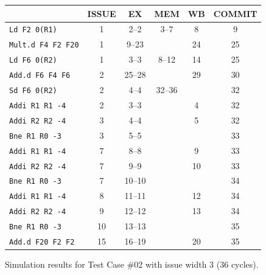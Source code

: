 \documentclass[11pt]{article}
\renewcommand{\_}{\origunderscore\allowbreak}
\begin{document}
\begin{figure}[H]
\centering
\small
\begin{tabular}{lccccc}
\hline
 & ISSUE & EX & MEM & WB & COMMIT \\
\hline
\texttt{Ld F2 0(R1)} & 1 & 2--2 & 3--7 & 8 & 9 \\
\texttt{Mult.d F4 F2 F20} & 1 & 9--23 &  & 24 & 25 \\
\texttt{Ld F6 0(R2)} & 1 & 3--3 & 8--12 & 14 & 25 \\
\texttt{Add.d F6 F4 F6} & 2 & 25--28 &  & 29 & 30 \\
\texttt{Sd F6 0(R2)} & 2 & 4--4 & 32--36 &  & 32 \\
\texttt{Addi R1 R1 -4} & 2 & 3--3 &  & 4 & 32 \\
\texttt{Addi R2 R2 -4} & 3 & 4--4 &  & 5 & 32 \\
\texttt{Bne R1 R0 -3} & 3 & 5--5 &  &  & 33 \\
\texttt{Addi R1 R1 -4} & 7 & 8--8 &  & 9 & 33 \\
\texttt{Addi R2 R2 -4} & 7 & 9--9 &  & 10 & 33 \\
\texttt{Bne R1 R0 -3} & 7 & 10--10 &  &  & 34 \\
\texttt{Addi R1 R1 -4} & 8 & 11--11 &  & 12 & 34 \\
\texttt{Addi R2 R2 -4} & 9 & 12--12 &  & 13 & 34 \\
\texttt{Bne R1 R0 -3} & 10 & 13--13 &  &  & 35 \\
\texttt{Add.d F20 F2 F2} & 15 & 16--19 &  & 20 & 35 \\
\hline
\end{tabular}
\caption{Simulation results for Test Case \#02 with issue width 3 (36 cycles).}
\end{figure}
\end{document}
